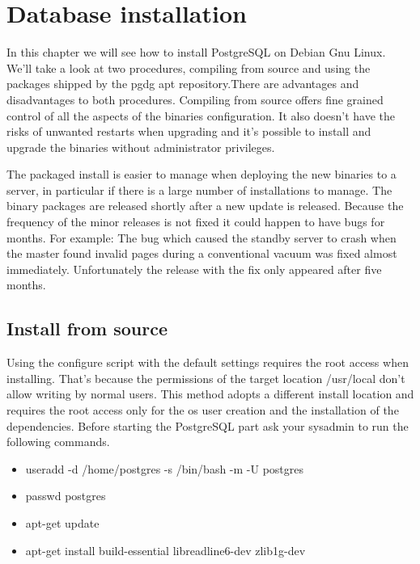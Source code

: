 \chapter{Database installation}

\label{cha:DB_INSTALL}

In this chapter we will see how to install PostgreSQL on Debian Gnu Linux.
We'll take a look at two procedures, compiling from source and using the
packages shipped by the pgdg  apt
repository.\newline There are advantages and disadvantages to both procedures.
Compiling from source offers fine grained control of all the aspects of the
binaries configuration. It also doesn't have the risks of unwanted restarts
when upgrading and it's possible to install and upgrade the binaries without
administrator privileges.\newline

The packaged install is easier to manage when deploying the new binaries to a
server, in particular if there is a large number of installations to manage.
The binary packages are released shortly after a new update is released.
Because the frequency of the minor releases is not fixed it could happen to
have bugs for months. For example: The bug which caused the standby server to
crash when the master found invalid pages during a conventional vacuum was
fixed almost immediately. Unfortunately the release with the fix only appeared
after five months.\newline

\section{Install from source}

\label{sec:INSTSOURCE}

Using the configure script with the default settings requires the root access
when installing. That's because the permissions of the target location
/usr/local don't allow writing by normal users. This method adopts a different
install location and requires the root access only for the os user creation and
the installation of the dependencies. Before starting the PostgreSQL part ask
your sysadmin to run the following commands.

\begin{itemize}

    \item useradd -d /home/postgres -s /bin/bash -m -U postgres
    \item passwd postgres
    \item apt-get update
    \item apt-get install build-essential libreadline6-dev zlib1g-dev

\end{itemize}

